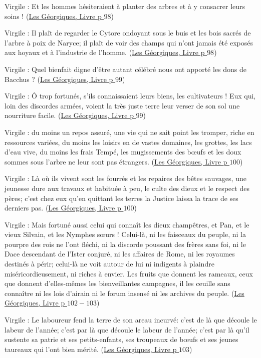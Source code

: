 \documentclass[a4paper, 11pt, hidelinks]{article}
\newcommand{\bs}{\bigskip}
\newcommand{\rb}[1]{\Romanbar{#1}}
\newcommand{\citer}[3]{\bs \begin{center} \textcolor{authorGray}{#1 :} \textcolor{citationRed}{\og #2 \fg} \textcolor{authorGray}{(\underline{#3})} \end{center} \bs}
\begin{document}
\citer{Virgile}{Et les hommes hésiteraient à planter des arbres et à y consacrer leurs soins !}{Les Géorgiques, Livre \rb{2} p $98$}


\citer{Virgile}{Il plaît de regarder le Cytore ondoyant sous le buis et les bois sacrés de l'arbre à poix de Naryce; il plaît
de voir des champs qui n'ont jamais été exposés aux hoyaux et à l'industrie de l'homme.}{Les Géorgiques, Livre \rb{2} p $98$}


\citer{Virgile}{Quel bienfait digne d'être autant célébré nous ont apporté les dons de Bacchus ?}{Les Géorgiques, Livre \rb{2} p $99$}


\citer{Virgile}{Ô trop fortunés, s'ils connaissaient leurs biens, les cultivateurs ! Eux qui, loin des discordes armées, voient la 
très juste terre leur verser de son sol une nourriture facile.}{Les Géorgiques, Livre \rb{2} p $99$}


\citer{Virgile}{du moins un repos assuré, une vie qui ne sait point les tromper, riche en ressources variées, du moins les loisirs en 
de vastes domaines, les grottes, les lacs d'eau vive, du moins les frais Tempé, les mugissements des b\oe ufs et les doux sommes sous 
l'arbre ne leur sont pas étrangers.}{Les Géorgiques, Livre \rb{2} p $100$}


\citer{Virgile}{Là où ils vivent sont les fourrés et les repaires des bêtes sauvages, une jeunesse dure aux travaux et habituée à peu,
le culte des dieux et le respect des pères; c'est chez eux qu'en quittant les terres la Justice laissa la trace de ses derniers pas.}{Les Géorgiques, Livre \rb{2} p $100$}


\citer{Virgile}{Mais fortuné aussi celui qui connaît les dieux champêtres, et Pan, et le vieux Silvain, et les Nymphes s\oe urs ! 
Celui-là, ni les faisceaux du peuple, ni la pourpre des rois ne l'ont fléchi, ni la discorde poussant des frères sans foi, ni le 
Dace descendant de l'Ister conjuré, ni les affaires de Rome, ni les royaumes destinés à périr; celui-là ne voit autour de lui
ni indigents à plaindre miséricordieusement, ni riches à envier. Les fruits que donnent les rameaux, ceux que donnent d'elles-mêmes
les bienveillantes campagnes, il les ceuille sans connaître ni les lois d'airain ni le forum insensé ni les archives du peuple.}{Les Géorgiques, Livre \rb{2} p $102-103$}


\citer{Virgile}{Le laboureur fend la terre de son areau incurvé: c'est de là que découle le labeur de l'année; c'est par là que découle
le labeur de l'année; c'est par là qu'il sustente sa patrie et ses petits-enfants, ses troupeaux de b\oe ufs et ses jeunes taureaux
qui l'ont bien mérité.}{Les Géorgiques, Livre \rb{2} p $103$}
\end{document}
